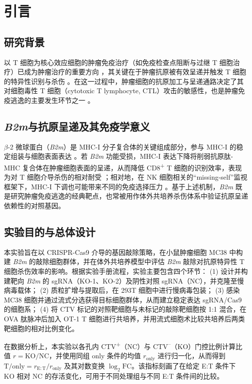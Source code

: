 \section{引言}
\label{sec:intro}

\subsection{研究背景}
以 T 细胞为核心效应细胞的肿瘤免疫治疗（如免疫检查点阻断与过继 T 细胞治疗）已成为肿瘤治疗的重要方向 \parencite{SharmaAllison2015Checkpoint}，其关键在于肿瘤抗原被有效呈递并触发 T 细胞的特异性识别与杀伤 \parencite{NeefjesEtAl2011MHCSystems}。在这一过程中，肿瘤细胞的抗原加工与呈递通路决定了其对细胞毒性 T 细胞（cytotoxic T lymphocyte, CTL）攻击的敏感性，也是肿瘤免疫逃逸的主要发生环节之一 \parencite{DhatchinamoorthyColbertRock2021MHCLoss}。

\subsection{\textit{B2m}与抗原呈递及其免疫学意义}
\(\beta\)-2 微球蛋白（\textit{B2m}）是 MHC-I 分子复合体的关键组成部分，参与 MHC-I 的稳定组装与细胞表面表达 \parencite{WangLiuWei2021B2MImmunotherapies}。若 \textit{B2m} 功能受损，MHC-I 表达下降将削弱抗原肽-MHC 复合体在肿瘤细胞表面的呈递，从而降低 CD8\textsuperscript{+} T 细胞的识别效率，表现为对 T 细胞介导杀伤的相对耐受 \parencite{ZaretskyGarciaDiazShinEtAl2016AcquiredResistancePD1}；相对地，在 NK 细胞相关的``missing-self''监视框架下，MHC-I 下调也可能带来不同的免疫选择压力 \parencite{Raulet2006MissingSelfNK}。基于上述机制，\textit{B2m} 既是研究肿瘤免疫逃逸的经典靶点，也常被用作体外共培养杀伤体系中验证抗原呈递依赖性的对照基因。

\subsection{实验目的与总体设计}
本实验旨在以 CRISPR-Cas9 介导的基因敲除策略，在小鼠肿瘤细胞 MC38 中构建 \textit{B2m} 的敲除细胞群体，并在体外共培养模型中评估 \textit{B2m} 敲除对抗原特异性 T 细胞杀伤效率的影响。根据实验手册流程，实验主要包含四个环节：
(1) 设计并构建靶向 \textit{B2m} 的 sgRNA（KO-1、KO-2）及阴性对照 sgRNA（NC），并克隆至慢病毒载体；
(2) 质粒扩增与提取后，在 293T 细胞中进行慢病毒包装；
(3) 感染 MC38 细胞并通过流式分选获得目标细胞群体，从而建立稳定表达 sgRNA/Cas9 的细胞系；
(4) 将 CTV 标记的对照靶细胞与未标记的敲除靶细胞按 1:1 混合，在 OVA 肽脉冲后加入 OT-1 T 细胞进行共培养，并用流式细胞术比较共培养后两类靶细胞的相对比例变化。

在数据分析上，本实验以各孔内 CTV\textsuperscript{+}（NC）与 CTV\textsuperscript{--}（KO）门控比例计算比值 \(r=\mathrm{KO}/\mathrm{NC}\)，并使用同组 only 条件的均值 \(r_{\mathrm{only}}\) 进行归一化，从而得到 \(\mathrm{T/only}=r_{\mathrm{E:T}}/r_{\mathrm{only}}\) 及其对数变换 \(\log_2\mathrm{FC}\)。该指标刻画了在给定 E:T 条件下 KO 相对 NC 的存活变化，可用于不同处理组与不同 E:T 条件间的比较。